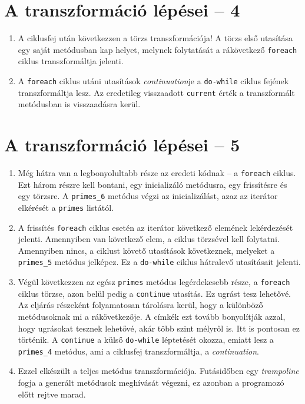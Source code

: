 \documentclass[12pt, a4paper]{article}
\begin{document}
\section{A transzformáció lépései -- 4}

\begin{enumerate}
    \item
    A ciklusfej után következzen a törzs transzformációja! A törzs első utasítása egy saját metódusban kap helyet, melynek folytatását a rákövetkező \texttt{foreach} ciklus transzformáltja jelenti.
    \item
    A \texttt{foreach} ciklus utáni utasítások \textit{continuation}je a \texttt{do-while} ciklus fejének transzformáltja lesz. Az eredetileg visszaadott \texttt{current} érték a transzformált metódusban is visszaadásra kerül.
\end{enumerate}

\section{A transzformáció lépései -- 5}

\begin{enumerate}
    \item
    Még hátra van a legbonyolultabb része az eredeti kódnak -- a \texttt{foreach} ciklus. Ezt három részre kell bontani, egy inicializáló metódusra, egy frissítésre és egy törzsre. A \texttt{primes\_6} metódus végzi az inicializálást, azaz az iterátor elkérését a \texttt{primes} listától.
    \item
    A frissítés \texttt{foreach} ciklus esetén az iterátor következő elemének lekérdezését jelenti. Amennyiben van következő elem, a ciklus törzsével kell folytatni. Amennyiben nincs, a ciklust követő utasítások következnek, melyeket a \texttt{primes\_5} metódus jelképez. Ez a \texttt{do-while} ciklus hátralevő utasításait jelenti.
    \item
    Végül következzen az egész \texttt{primes} metódus legérdekesebb része, a \texttt{foreach} ciklus törzse, azon belül pedig a \texttt{continue} utasítás. Ez ugrást tesz lehetővé. Az eljárás részeként folyamatosan tárolásra kerül, hogy a különböző metódusoknak mi a rákövetkezője. A címkék ezt tovább bonyolítják azzal, hogy ugrásokat tesznek lehetővé, akár több szint mélyről is. Itt is pontosan ez történik. A \texttt{continue} a külső \texttt{do-while} léptetését okozza, emiatt lesz a \texttt{primes\_4} metódus, ami a ciklusfej transzformáltja, a \textit{continuation}.
    \item
    Ezzel elkészült a teljes metódus transzformációja. Futásidőben egy \textit{trampoline} fogja a generált metódusok meghívását végezni, ez azonban a programozó előtt rejtve marad.
\end{enumerate}
\end{document}
